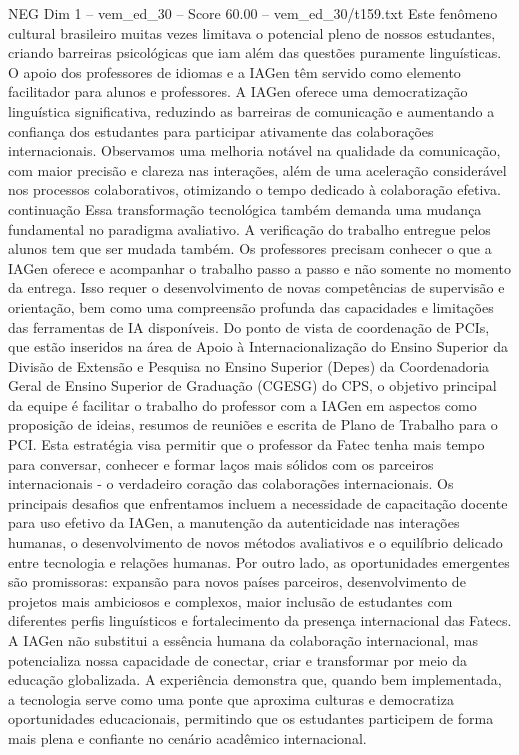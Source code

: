 \begin{textsample}{NEG Dim 1 – vem\_ed\_30 – Score 60.00 – vem\_ed\_30/t159.txt}
Este fenômeno cultural brasileiro muitas vezes limitava o potencial pleno de nossos estudantes, criando barreiras psicológicas que iam além das questões puramente linguísticas.
O apoio dos professores de idiomas e a IAGen têm servido como elemento facilitador para alunos e professores.
A IAGen oferece uma democratização linguística significativa, reduzindo as barreiras de comunicação e aumentando a confiança dos estudantes para participar ativamente das colaborações internacionais.
Observamos uma melhoria notável na qualidade da comunicação, com maior precisão e clareza nas interações, além de uma aceleração considerável nos processos colaborativos, otimizando o tempo dedicado à colaboração efetiva. continuação Essa transformação tecnológica também demanda uma mudança fundamental no paradigma avaliativo.
A verificação do trabalho entregue pelos alunos tem que ser mudada também.
Os professores precisam conhecer o que a IAGen oferece e acompanhar o trabalho passo a passo e não somente no momento da entrega.
Isso requer o desenvolvimento de novas competências de supervisão e orientação, bem como uma compreensão profunda das capacidades e limitações das ferramentas de IA disponíveis.
Do ponto de vista de coordenação de PCIs, que estão inseridos na área de Apoio à Internacionalização do Ensino Superior da Divisão de Extensão e Pesquisa no Ensino Superior (Depes) da Coordenadoria Geral de Ensino Superior de Graduação (CGESG) do CPS, o objetivo principal da equipe é facilitar o trabalho do professor com a IAGen em aspectos como proposição de ideias, resumos de reuniões e escrita de Plano de Trabalho para o PCI.
Esta estratégia visa permitir que o professor da Fatec tenha mais tempo para conversar, conhecer e formar laços mais sólidos com os parceiros internacionais - o verdadeiro coração das colaborações internacionais.
Os principais desafios que enfrentamos incluem a necessidade de capacitação docente para uso efetivo da IAGen, a manutenção da autenticidade nas interações humanas, o desenvolvimento de novos métodos avaliativos e o equilíbrio delicado entre tecnologia e relações humanas.
Por outro lado, as oportunidades emergentes são promissoras: expansão para novos países parceiros, desenvolvimento de projetos mais ambiciosos e complexos, maior inclusão de estudantes com diferentes perfis linguísticos e fortalecimento da presença internacional das Fatecs.
A IAGen não substitui a essência humana da colaboração internacional, mas potencializa nossa capacidade de conectar, criar e transformar por meio da educação globalizada.
A experiência demonstra que, quando bem implementada, a tecnologia serve como uma ponte que aproxima culturas e democratiza oportunidades educacionais, permitindo que os estudantes participem de forma mais plena e confiante no cenário acadêmico internacional.

\end{textsample}
